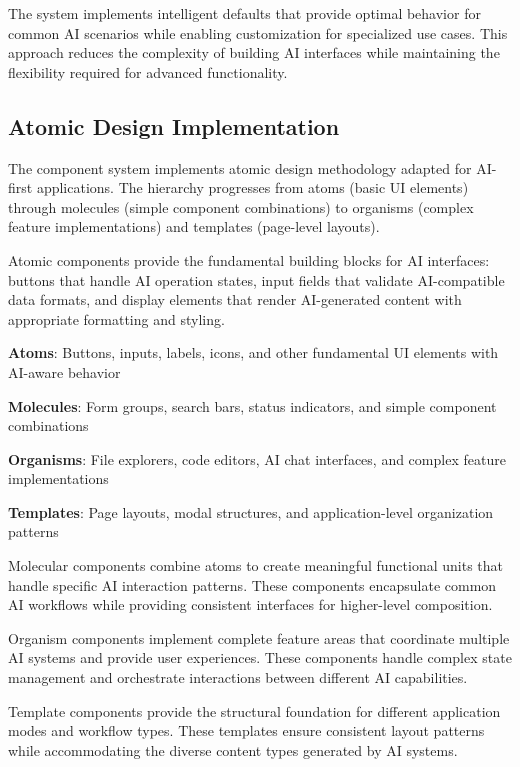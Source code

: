 The system implements intelligent defaults that provide optimal behavior for common AI scenarios while enabling customization for specialized use cases. This approach reduces the complexity of building AI interfaces while maintaining the flexibility required for advanced functionality.

\subsection*{Atomic Design Implementation}

The component system implements atomic design methodology adapted for AI-first applications. The hierarchy progresses from atoms (basic UI elements) through molecules (simple component combinations) to organisms (complex feature implementations) and templates (page-level layouts).

Atomic components provide the fundamental building blocks for AI interfaces: buttons that handle AI operation states, input fields that validate AI-compatible data formats, and display elements that render AI-generated content with appropriate formatting and styling.

\begin{expandedlist}
    \item \textbf{Atoms}: Buttons, inputs, labels, icons, and other fundamental UI elements with AI-aware behavior
    \item \textbf{Molecules}: Form groups, search bars, status indicators, and simple component combinations
    \item \textbf{Organisms}: File explorers, code editors, AI chat interfaces, and complex feature implementations
    \item \textbf{Templates}: Page layouts, modal structures, and application-level organization patterns
\end{expandedlist}

Molecular components combine atoms to create meaningful functional units that handle specific AI interaction patterns. These components encapsulate common AI workflows while providing consistent interfaces for higher-level composition.

Organism components implement complete feature areas that coordinate multiple AI systems and provide user experiences. These components handle complex state management and orchestrate interactions between different AI capabilities.

Template components provide the structural foundation for different application modes and workflow types. These templates ensure consistent layout patterns while accommodating the diverse content types generated by AI systems.

